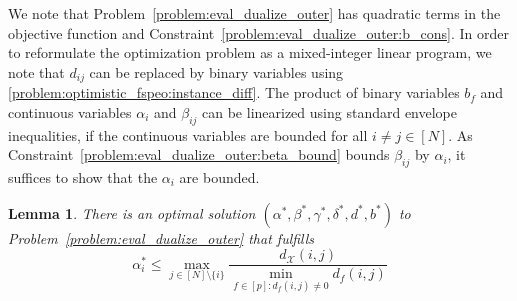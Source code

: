 \documentclass[11pt, a4paper]{article}
\newtheorem{lemma}{Lemma}
\newcommand{\FRil}[1]{\todo[color=black, textcolor=white, inline, author=FR]{#1}}
\newcommand{\X}{{\mathcal{X}}} %
\newcommand{\instanceindex}{i}
\newcommand{\instanceindextwo}{j}
\newcommand{\instfeatures}{[p]} %
\newcommand{\soldist}[1][(\instanceindex,\instanceindextwo)]{d_\X#1} %
\begin{document}
We note that Problem~\eqref{problem:eval_dualize_outer} has quadratic terms in the objective function and Constraint~\eqref{problem:eval_dualize_outer:b_cons}. In order to reformulate the optimization problem as a mixed-integer linear program, we note that $d_{ij}$ can be replaced by binary variables using \eqref{problem:optimistic_fspeo:instance_diff}.
The product of binary variables $b_f$ and continuous variables $\alpha_i$ and $\beta_{ij}$ can be linearized using standard envelope inequalities, if
the continuous variables are bounded for all $i\neq j \in [N]$. As Constraint~\eqref{problem:eval_dualize_outer:beta_bound} bounds $\beta_{ij}$ by $\alpha_i$, it suffices to show that the $\alpha_i$ are bounded.
\begin{lemma}\label{lemma:bound_on_alpha}
	There is an optimal solution $(\alpha^*, \beta^*, \gamma^*, \delta^*, d^*, b^*)$ to Problem~\eqref{problem:eval_dualize_outer} that fulfills
	\begin{equation}
		\label{alphabound}\alpha_i^* \leq \max_{j \in [N]\setminus\{i\}} \frac{\soldist}{\min_{f\in \instfeatures: d_f(i,j) \neq 0} d_f(i,j)}
	\end{equation}
\end{lemma}
\end{document}
